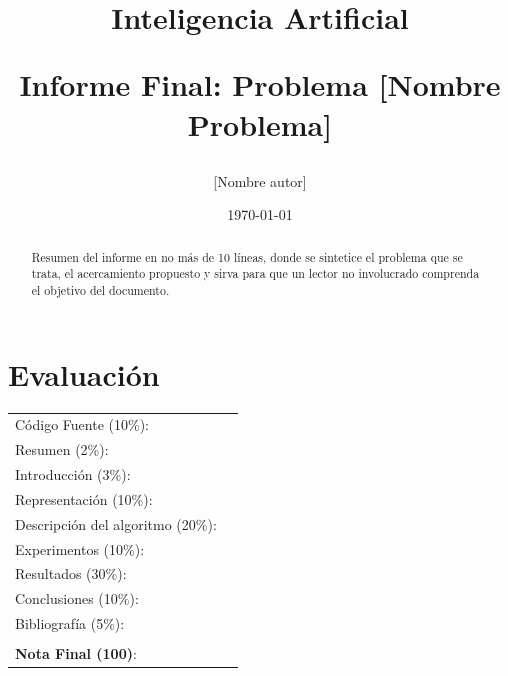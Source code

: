 \documentclass[letter, 10pt]{article}
\begin{document}
\title{Inteligencia Artificial \\ \begin{Large}Informe Final: Problema [Nombre Problema]\end{Large}}
\author{[Nombre autor]}
\date{\today}
\maketitle


\section*{Evaluaci\'on}

\begin{tabular}{ll}
C\'odigo Fuente (10\%): &  \underline{\hspace{2cm}}\\
Resumen (2\%):  & \underline{\hspace{2cm}} \\
Introducci\'on (3\%):  & \underline{\hspace{2cm}} \\
Representaci\'on (10\%):  & \underline{\hspace{2cm}} \\
Descripci\'on del algoritmo (20\%):  & \underline{\hspace{2cm}} \\
Experimentos (10\%):  & \underline{\hspace{2cm}} \\
Resultados (30\%):  & \underline{\hspace{2cm}} \\
Conclusiones (10\%): &  \underline{\hspace{2cm}}\\
Bibliograf\'ia (5\%): & \underline{\hspace{2cm}}\\
 &  \\
\textbf{Nota Final (100)}:   & \underline{\hspace{2cm}}
\end{tabular}

\begin{abstract}
Resumen del informe en no m\'as de 10 l\'ineas, donde se sintetice el problema que se trata, el acercamiento propuesto
y sirva para que un lector no involucrado comprenda el objetivo del documento.
\end{abstract}
\end{document}
